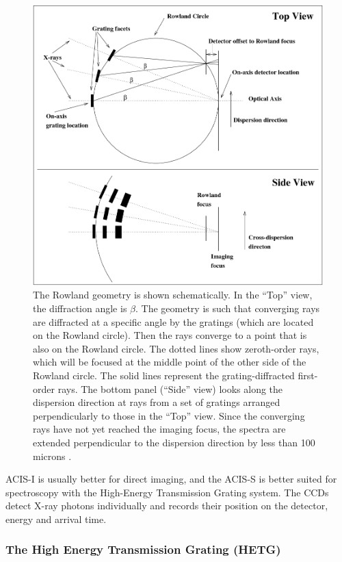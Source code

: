\begin{figure}
    \centering
    \includegraphics[width = 0.8 \linewidth]{Chapters/Figures/rowland.png}
    \caption{The Rowland geometry is shown schematically. In the ``Top'' view, the diffraction angle is $\beta$. The geometry is such that converging rays are diffracted at a specific angle by the gratings (which are located on the Rowland circle). Then the rays converge to a point that is also on the Rowland circle. The dotted lines show zeroth-order rays, which will be focused at the middle point of the other side of the Rowland circle. The solid lines represent the grating-diffracted first-order rays. The bottom panel (``Side'' view) looks along the dispersion direction at rays from a set of gratings arranged perpendicularly to those in the ``Top'' view. Since the converging rays have not yet reached the imaging focus, the spectra are extended perpendicular to the dispersion direction by less than 100 microns \citep{ChandraMSFC}.}
    \label{rowland}
\end{figure}


ACIS-I is usually better for direct imaging, and the ACIS-S is better suited for spectroscopy with the High-Energy Transmission Grating system. The CCDs detect X-ray photons individually and records their position on the detector, energy and arrival time. \par 



\subsubsection{The High Energy Transmission Grating (HETG)}

